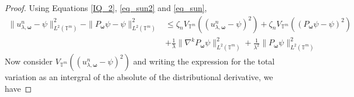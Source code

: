 \documentclass[multixcb]{amstext-l}
\theoremstyle{plain}
\theoremstyle{definition}
\theoremstyle{definition}
\theoremstyle{remark}
\numberwithin{equation}{chapter}
\begin{document}
\begin{proof}
    
Using Equations \ref{IQ_2}, \ref{eq_sun2} and \ref{eq_sun},  
\begin{equation}\label{eq_error}
\begin{aligned}
\|u_{\lambda,\boldsymbol{\omega}}^n - \psi\|^2_{L^2(\mathbb{T}^m)}  -    \|P_{\boldsymbol{\omega}}\psi - \psi\|^2_{L^2(\mathbb{T}^m)} &\le \zeta_n V_{\mathbb{T}^m}((u_{\lambda,\boldsymbol{\omega}}^n - \psi)^2)  + \zeta_n V_{\mathbb{T}^m}((P_{\boldsymbol{\omega}}\psi-\psi)^2)\\
    &+ \frac{1}{\lambda}\|\nabla^kP_{\boldsymbol{\omega}}\psi\|_{L^2(\mathbb{T}^m)}^2 + \frac{1}{\lambda^2}\|P_{\boldsymbol{\omega}}\psi\|_{L^2(\mathbb{T}^m)}^2
\end{aligned}
\end{equation}
Now consider $V_{\mathbb{T}^m}((u_{\lambda,\boldsymbol{\omega}}^n - \psi)^2)$ and writing the expression for the total variation as an intergral of the absolute of the distributional derivative, we have 



\end{proof}
\end{document}
